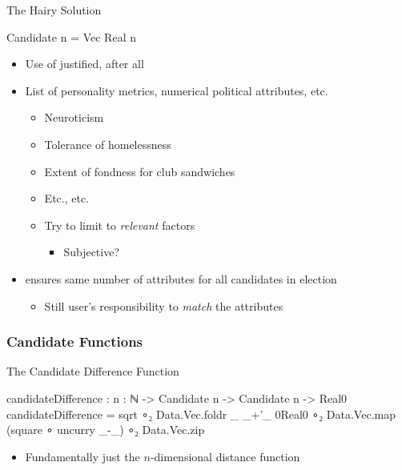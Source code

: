 \documentclass{beamer}
\begin{document}
\begin{frame}{The Hairy Solution}
\begin{code}
Candidate n = Vec Real n
\end{code}

\begin{itemize}
  \item Use of  justified, after all
  \item List of personality metrics, numerical political attributes, etc.
  \begin{itemize}
    \item Neuroticism
    \item Tolerance of homelessness
    \item Extent of fondness for club sandwiches
    \item Etc., etc.
    \item Try to limit to \emph{relevant} factors
    \begin{itemize}
      \item Subjective?
    \end{itemize}
  \end{itemize}
  \item {} ensures same number of attributes for all candidates in election
  \begin{itemize}
    \item Still user's responsibility to \emph{match} the attributes
  \end{itemize}
\end{itemize}
\end{frame}

\subsubsection{Candidate Functions}

\begin{frame}{The Candidate Difference Function}
\begin{code}
candidateDifference :
  {n : ℕ} -> Candidate n -> Candidate n -> Real0
candidateDifference =
  sqrt ∘₂
   Data.Vec.foldr _ _+'_ 0Real0 ∘₂
   Data.Vec.map (square ∘ uncurry _-_) ∘₂
   Data.Vec.zip
\end{code}

\begin{itemize}
  \item Fundamentally just the \(n\)-dimensional distance function
\end{itemize}
\end{frame}
\end{document}

